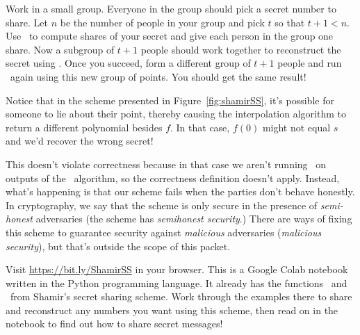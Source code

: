 \begin{bonus}\label{bon:rec-groups}
    Work in a small group. Everyone in the group should pick 
    a secret number to share. Let $n$ be the number of people in 
    your group and pick $t$ so that $t+1 < n$. Use \share~to 
    compute shares of your secret and give each person in the group
    one share. Now a subgroup of $t+1$ people should work together 
    to reconstruct the secret using \rec\footnotemark. Once you succeed, 
    form a different group of $t+1$ people and run \rec~again
    using this new group of points. You should get the same 
    result!
\end{bonus}

Notice that in the scheme presented in Figure~\ref{fig:shamirSS},
it's possible for someone to lie about their point, thereby 
causing the interpolation algorithm to return a different 
polynomial besides $f$. In that case, $f(0)$ might not equal $s$ 
and we'd recover the wrong secret!

This doesn't violate correctness because in that case 
we aren't running \rec~on outputs of the \share~algorithm, so 
the correctness definition doesn't apply. Instead, what's happening 
is that our scheme fails when the parties don't behave honestly.
In cryptography, we say that the scheme is only secure in the 
presence of \emph{semi-honest} adversaries (the scheme has 
\emph{semihonest security}.) There are ways of fixing this scheme 
to guarantee security against \emph{malicious} adversaries 
(\emph{malicious security}), but that's outside the scope of this 
packet.

\begin{exercise}
    Visit \url{https://bit.ly/ShamirSS} in your browser. This is a 
    Google Colab notebook written in the Python programming language. 
    It already has the functions \share~and \rec~from Shamir's secret 
    sharing scheme. Work through the examples there to 
    share and reconstruct any numbers you want using this scheme, 
    then read on in the notebook to find out how to share secret messages!
\end{exercise}

